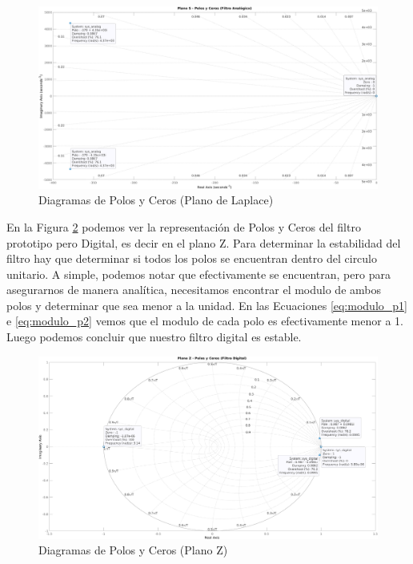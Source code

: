 \begin{figure}[H]
  \centering
  \includegraphics[width=\linewidth]{images/filtros-digitales/pz_laplace.png}
  \caption{Diagramas de Polos y Ceros (Plano de Laplace)}
  \label{fig:pz_laplace}
\end{figure}

En la Figura \ref{fig:pz_z} podemos ver la representación de Polos y Ceros del filtro prototipo pero Digital, es decir en el plano Z. Para determinar la estabilidad del filtro hay que determinar si todos los polos se encuentran dentro del circulo unitario. A simple, podemos notar que efectivamente se encuentran, pero para asegurarnos de manera analítica, necesitamos encontrar el modulo de ambos polos y determinar que sea menor a la unidad. En las Ecuaciones \ref{eq:modulo_p1} e \ref{eq:modulo_p2} vemos que el modulo de cada polo es efectivamente menor a 1. Luego podemos concluir que nuestro filtro digital es estable.

\begin{figure}[H]
  \centering
  \includegraphics[width=\linewidth]{images/filtros-digitales/pz_z.png}
  \caption{Diagramas de Polos y Ceros (Plano Z)}
  \label{fig:pz_z}
\end{figure}

